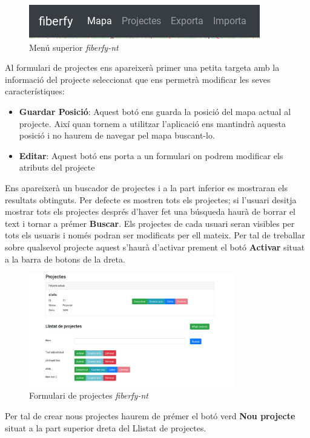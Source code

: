 \documentclass[a4paper]{article}
\begin{document}
	\begin{figure}[H]
		\centering
		\includegraphics{images/topbar_menu_1.png}
		\caption{Menú superior \emph{fiberfy-nt}}
	\end{figure}
	Al formulari de projectes ens apareixerà primer una petita targeta amb la informació del projecte seleccionat que ens permetrà modificar les seves característiques:
	\begin{itemize}
		\item \textbf{Guardar Posició}: Aquest botó ens guarda la posició del mapa actual al projecte. Així quan tornem a utilitzar l'aplicació ens mantindrà aquesta posició i no haurem de navegar pel mapa buscant-lo.
		\item \textbf{Editar}: Aquest botó ens porta a un formulari on podrem modificar els atributs del projecte
	\end{itemize}
	Ens apareixerà un buscador de projectes i a la part inferior es mostraran els resultats obtinguts. Per defecte es mostren tots els projectes; si l'usuari desitja mostrar tots els projectes després d'haver fet una búsqueda haurà de borrar el text i tornar a prémer \textbf{Buscar}.
	Els projectes de cada usuari seran visibles per tots els usuaris i només podran ser modificats per ell mateix. Per tal de treballar sobre qualsevol projecte aquest s'haurà d'activar prement el botó \textbf{Activar} situat a la barra de botons de la dreta.
	
	\begin{figure}[H]
		\centering
		\includegraphics[width=0.8\textwidth]{images/projects_form.png}
		\caption{Formulari de projectes \emph{fiberfy-nt}}
	\end{figure}

	Per tal de crear nous projectes haurem de prémer el botó verd \textbf{Nou projecte} situat a la part superior dreta del Llistat de projectes.
	
\end{document}
